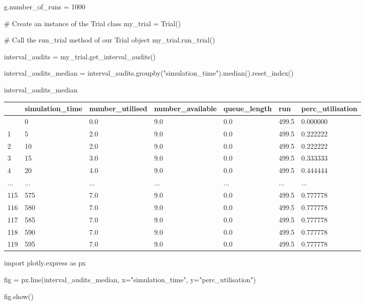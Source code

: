 \documentclass[
  letterpaper,
  DIV=11,
  numbers=noendperiod]{scrreprt}
\newenvironment{Shaded}{}{}
\newcommand{\CommentTok}[1]{\textcolor[rgb]{0.42,0.45,0.49}{#1}}
\newcommand{\DecValTok}[1]{\textcolor[rgb]{0.00,0.36,0.77}{#1}}
\newcommand{\ImportTok}[1]{\textcolor[rgb]{0.01,0.18,0.38}{#1}}
\newcommand{\NormalTok}[1]{\textcolor[rgb]{0.14,0.16,0.18}{#1}}
\newcommand{\OperatorTok}[1]{\textcolor[rgb]{0.14,0.16,0.18}{#1}}
\newcommand{\StringTok}[1]{\textcolor[rgb]{0.01,0.18,0.38}{#1}}
\begin{document}
\begin{Shaded}
\begin{Highlighting}[]
\NormalTok{g.number\_of\_runs }\OperatorTok{=} \DecValTok{1000}

\CommentTok{\# Create an instance of the Trial class}
\NormalTok{my\_trial }\OperatorTok{=}\NormalTok{ Trial()}

\CommentTok{\# Call the run\_trial method of our Trial object}
\NormalTok{my\_trial.run\_trial()}

\NormalTok{interval\_audits }\OperatorTok{=}\NormalTok{ my\_trial.get\_interval\_audits()}

\NormalTok{interval\_audits\_median }\OperatorTok{=}\NormalTok{ interval\_audits.groupby(}\StringTok{"simulation\_time"}\NormalTok{).median().reset\_index()}

\NormalTok{interval\_audits\_median}
\end{Highlighting}
\end{Shaded}

\begin{longtable}[]{@{}lllllll@{}}
\toprule\noalign{}
& simulation\_time & number\_utilised & number\_available &
queue\_length & run & perc\_utilisation \\
\midrule\noalign{}
\endhead
\bottomrule\noalign{}
\endlastfoot
0 & 0 & 0.0 & 9.0 & 0.0 & 499.5 & 0.000000 \\
1 & 5 & 2.0 & 9.0 & 0.0 & 499.5 & 0.222222 \\
2 & 10 & 2.0 & 9.0 & 0.0 & 499.5 & 0.222222 \\
3 & 15 & 3.0 & 9.0 & 0.0 & 499.5 & 0.333333 \\
4 & 20 & 4.0 & 9.0 & 0.0 & 499.5 & 0.444444 \\
... & ... & ... & ... & ... & ... & ... \\
115 & 575 & 7.0 & 9.0 & 0.0 & 499.5 & 0.777778 \\
116 & 580 & 7.0 & 9.0 & 0.0 & 499.5 & 0.777778 \\
117 & 585 & 7.0 & 9.0 & 0.0 & 499.5 & 0.777778 \\
118 & 590 & 7.0 & 9.0 & 0.0 & 499.5 & 0.777778 \\
119 & 595 & 7.0 & 9.0 & 0.0 & 499.5 & 0.777778 \\
\end{longtable}

\begin{Shaded}
\begin{Highlighting}[]
\ImportTok{import}\NormalTok{ plotly.express }\ImportTok{as}\NormalTok{ px}

\NormalTok{fig }\OperatorTok{=}\NormalTok{ px.line(interval\_audits\_median, x}\OperatorTok{=}\StringTok{"simulation\_time"}\NormalTok{, y}\OperatorTok{=}\StringTok{"perc\_utilisation"}\NormalTok{)}

\NormalTok{fig.show()}
\end{Highlighting}
\end{Shaded}
\end{document}
